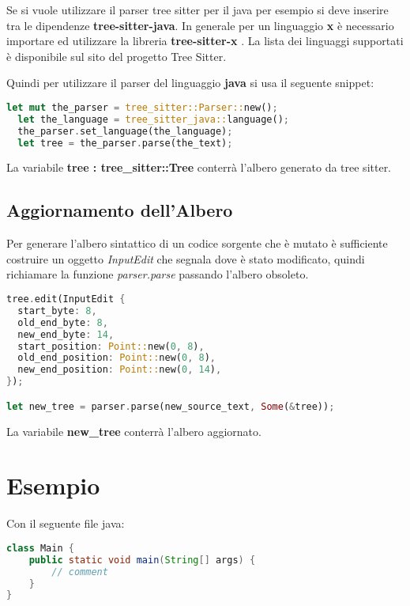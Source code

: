 Se si vuole utilizzare il parser tree sitter per il java per esempio si deve inserire tra le dipendenze \textbf{tree-sitter-java}.
In generale per un linguaggio \textbf{x} \`e necessario importare ed utilizzare la libreria \textbf{tree-sitter-x} \cite{TreeSitterRustGrammars}.
La lista dei linguaggi supportati \`e disponibile sul sito del progetto Tree Sitter.

Quindi per utilizzare il parser del linguaggio \textbf{java} si usa il seguente snippet:

\begin{lstlisting}[language=Rust]
  let mut the_parser = tree_sitter::Parser::new();
  let the_language = tree_sitter_java::language();
  the_parser.set_language(the_language);
  let tree = the_parser.parse(the_text);
\end{lstlisting}

La variabile \textbf{tree : tree\_sitter::Tree} conterr\`a l'albero generato da tree sitter.

\subsection{Aggiornamento dell'Albero}

Per generare l'albero sintattico di un codice sorgente che \`e mutato \`e sufficiente costruire un oggetto \emph{InputEdit} che segnala dove \`e stato modificato, quindi richiamare la funzione \emph{parser.parse} passando l'albero obsoleto.

\begin{lstlisting}[language=Rust]
tree.edit(InputEdit {
  start_byte: 8,
  old_end_byte: 8,
  new_end_byte: 14,
  start_position: Point::new(0, 8),
  old_end_position: Point::new(0, 8),
  new_end_position: Point::new(0, 14),
});

let new_tree = parser.parse(new_source_text, Some(&tree));
\end{lstlisting}

La variabile \textbf{new\_tree} conterr\`a l'albero aggiornato.

\section{Esempio}

Con il seguente file java:

\begin{lstlisting}[language=Java]
class Main {
	public static void main(String[] args) {
    	// comment
    }
}
\end{lstlisting}

